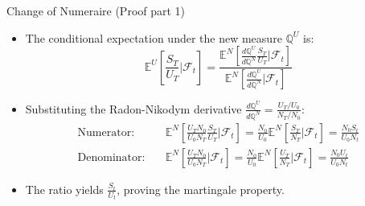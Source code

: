 \documentclass{beamer}
\begin{document}
\begin{frame}{Change of Numeraire (Proof part 1)}
	\begin{itemize}
		\item The conditional expectation under the new measure $\mathbb{Q}^U$ is:
		\begin{equation*}
			\mathbb{E}^U \left[ \frac{S_T}{U_T} \bigg| \mathcal{F}_t \right] = \frac{\mathbb{E}^N \left[ \frac{d\mathbb{Q}^U}{d\mathbb{Q}^N} \frac{S_T}{U_T} \bigg| \mathcal{F}_t \right]}{\mathbb{E}^N \left[ \frac{d\mathbb{Q}^U}{d\mathbb{Q}^N} \bigg| \mathcal{F}_t \right]}
		\end{equation*}
		\item Substituting the Radon-Nikodym derivative $\frac{d\mathbb{Q}^U}{d\mathbb{Q}^N} = \frac{U_T / U_0}{N_T / N_0}$:
		\begin{align*}
			\text{Numerator:} \quad & \mathbb{E}^N \left[ \frac{U_T N_0}{U_0 N_T} \frac{S_T}{U_T} \bigg| \mathcal{F}_t \right] = \frac{N_0}{U_0} \mathbb{E}^N \left[ \frac{S_T}{N_T} \bigg| \mathcal{F}_t \right] = \frac{N_0 S_t}{U_0 N_t} \\
			\text{Denominator:} \quad & \mathbb{E}^N \left[ \frac{U_T N_0}{U_0 N_T} \bigg| \mathcal{F}_t \right] = \frac{N_0}{U_0} \mathbb{E}^N \left[ \frac{U_T}{N_T} \bigg| \mathcal{F}_t \right] = \frac{N_0 U_t}{U_0 N_t}
		\end{align*}
		\item The ratio yields $\frac{S_t}{U_t}$, proving the martingale property.
	\end{itemize}
	\myendproof
\end{frame}
\end{document}
